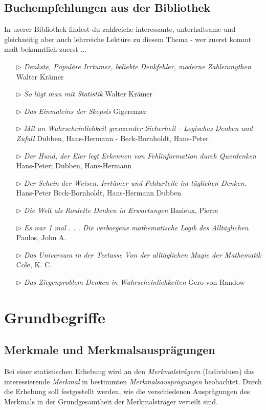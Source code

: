 \documentclass[a4paper, twoside, parskip, 10pt, smallheadings]{scrbook}
\theoremstyle{plain}
\theoremstyle{definition}
\begin{document}
\subsection*{Buchempfehlungen aus der Bibliothek}
In userer Bibliothek findest du zahlreiche interessante, unterhaltsame und gleichzeitig aber auch lehrreiche Lektüre zu diesem Thema - wer zuerst kommt malt bekanntlich zuerst ...
\begin{itemize}
\item [$\rhd$] {\it Denkste, Populäre Irrtumer, beliebte Denkfehler, moderne Zahlenmythen} Walter Krämer
\item [$\rhd$]{\it So lügt man mit Statistik} Walter Krämer  	
\item [$\rhd$]{\it Das Einmaleins der Skepsis} 	Gigerenzer
\item [$\rhd$]{\it Mit an Wahrscheinlichkeit grenzender Sicherheit - Logisches Denken und Zufall} Dubben, Hans-Hermann - Beck-Bornholdt, Hans-Peter 
\item [$\rhd$]{\it Der Hund, der Eier legt Erkennen von Fehlinformation durch Querdenken } 	Hans-Peter; Dubben, Hans-Hermann
\item [$\rhd$]{\it Der Schein der Weisen. Irrtümer und Fehlurteile im täglichen Denken.} Hans-Peter Beck-Bornholdt, Hans-Hermann Dubben
\item [$\rhd$]{\it  Die Welt als Roulette Denken in Erwartungen} Basieux, Pierre 	
\item [$\rhd$]{\it Es war 1 mal . . . Die verborgene mathematische Logik des Alltäglichen} Paulos, John A.
\item [$\rhd$]{\it Das Universum in der Teetasse Von der alltäglichen Magie der Mathematik} Cole, K. C. 
\item [$\rhd$] {\it Das Ziegenproblem Denken in Wahrscheinlichkeiten}  Gero von Randow
\end{itemize}




\section{Grundbegriffe}
\subsection{Merkmale und Merkmalsauspr\"{a}gungen} Bei einer statistischen Erhebung wird an
den {\it Merkmalstr\"{a}gern} (Individuen) das interessierende {\it Merkmal} in bestimmten {\it
Merkmalsauspr\"{a}gungen} beobachtet. Durch die Erhebung soll festgestellt werden, wie die
verschiedenen Auspr\"{a}gungen des Merkmals in der Grundgesamtheit der Merkmalstr\"{a}ger verteilt
sind.
\end{document}
